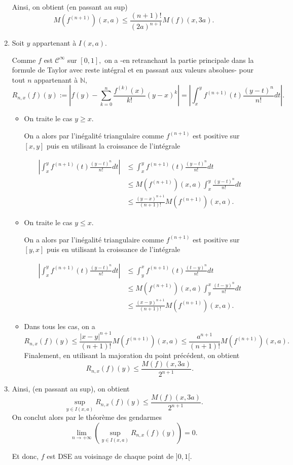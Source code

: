 \begin{enumerate}
Ainsi, on obtient (en passant au sup) $$M(f^{(n+1)})(x,a)\leq \frac{(n+1)!}{(2a)^{n+1}}M(f)(x,3a).$$

\item Soit $y$ appartenant \`{a} $I(x,a).$ 

Comme $f$ est $\mathcal{C}^{\infty}$ sur $[0,1],$ on a -en retranchant la partie principale dans la formule de Taylor avec reste int\'{e}gral et en passant aux valeurs absolues- pour tout $n$ appartenant \`{a} $\mathbb{N},$
$$R_{n,x}(f)(y):=\left\vert f(y)-\sum_{k=0}^{n}\frac{f^{(k)}(x)}{k!}(y-x)^{k} \right\vert = \left\vert \int_{x}^{y}f^{(n+1)}(t)\frac{(y-t)^{n}}{n!}dt \right\vert.$$

\begin{itemize}
\item On traite le cas $y\geq x.$ 

On a alors par l'in\'{e}galit\'{e} triangulaire comme $f^{(n+1)}$ est positive sur $[x,y]$ puis en utilisant la croissance de l'int\'{e}grale

\begin{align*}
\left \vert \int_{x}^{y}f^{(n+1)}(t)\frac{(y-t)^{n}}{n!}dt \right \vert & \leq \int_{x}^{y}f^{(n+1)}(t)\frac{(y-t)^{n}}{n!}dt\\
& \leq M(f^{(n+1)})(x,a)\int_{x}^{y}\frac{(y-t)^{n}}{n!}dt\\
& \leq \frac{(y-x)^{n+1}}{(n+1)!}M(f^{(n+1)})(x,a).
\end{align*}

\item On traite le cas $y\leq x.$ 

On a alors par l'in\'{e}galit\'{e} triangulaire comme $f^{(n+1)}$ est positive sur $[y,x]$ puis en utilisant la croissance de l'int\'{e}grale 

\begin{align*}
\left\vert \int_{x}^{y}f^{(n+1)}(t)\frac{(y-t)^{n}}{n!}dt \right\vert & \leq \int_{y}^{x}f^{(n+1)}(t)\frac{(t-y)^{n}}{n!}dt\\
& \leq M(f^{(n+1)})(x,a)\int_{y}^{x}\frac{(t-y)^{n}}{n!}dt\\
& \leq \frac{ (x-y)^{n+1}}{(n+1)!}M(f^{(n+1)})(x,a).
\end{align*}

\item Dans tous les cas, on a $$R_{n,x}(f)(y)\leq \frac{ \vert x-y\vert^{n+1}}{(n+1)!}M(f^{(n+1)})(x,a)\leq \frac{a^{n+1}}{(n+1)!}M(f^{(n+1)})(x,a).$$
Finalement, en utilisant la majoration du point pr\'{e}c\'{e}dent, on obtient $$R_{n,x}(f)(y)\leq \frac{M(f)(x,3a)}{2^{n+1}}.$$
\end{itemize}

\item Ainsi, (en passant au sup), on obtient $$\sup_{y \in I(x,a)} R_{n,x}(f)(y)\leq \frac{M(f)(x,3a)}{2^{n+1}}.$$ On conclut alors par le th\'{e}or\`{e}me des gendarmes $$\lim_{n\rightarrow +\infty} \left(\sup_{y \in I(x,a)} R_{n,x}(f)(y)\right)=0.$$

Et donc, $f$ est DSE au voisinage de chaque point de $]0,1[.$

\end{enumerate}


